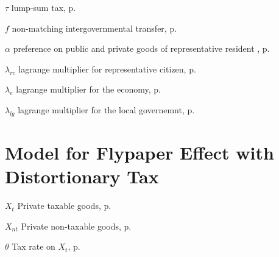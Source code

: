 \begin{eqlist}
    \item[$\tau$]
    lump-sum tax, p.~\pageref{y}

    \item[$f$]
    non-matching intergovernmental transfer, p.~\pageref{f}

    \item[$\alpha$]
    preference on public and private goods of representative resident , p.~\pageref{bmrcutility}

    \item[$\lambda_{rc}$]
    lagrange multiplier for representative citizen, p.~\pageref{bmrclagrangian}

    \item[$\lambda_{e}$]
    lagrange multiplier for the economy, p.~\pageref{bmeclagrangian}

    \item[$\lambda_{lg}$]
    lagrange multiplier for the local governemnt, p.~\pageref{bmeclagrangian}



    \section*{ Model for Flypaper Effect with Distortionary Tax}
    \item[$X_{t}$]
    Private taxable goods, p.~\pageref{Xt}

    \item[$X_{nt}$]
    Private non-taxable goods, p.~\pageref{Xt}

    \item[$\theta$]
    Tax rate on $X_t$, p.~\pageref{Xt}






\end{eqlist}